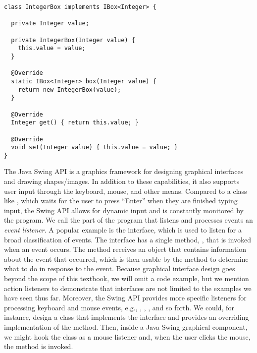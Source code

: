\begin{lstlisting}[language=MyJava]
class IntegerBox implements IBox<Integer> {
  
  private Integer value;
  
  private IntegerBox(Integer value) { 
    this.value = value; 
  }
  
  @Override
  static IBox<Integer> box(Integer value) { 
    return new IntegerBox(value); 
  }
  
  @Override
  Integer get() { return this.value; }
  
  @Override
  void set(Integer value) { this.value = value; }
}
\end{lstlisting}

The Java Swing API is a graphics framework for designing graphical interfaces and drawing shapes/images. In addition to these capabilities, it also supports user input through the keyboard, mouse, and other means. Compared to a class like , which waits for the user to press ``Enter'' when they are finished typing input, the Swing API allows for dynamic input and is constantly monitored by the program. We call the part of the program that listens and processes events an \emph{event listener}. A popular example is the  interface, which is used to listen for a broad classification of events. The  interface has a single method, , that is invoked when an event occurs. The  method receives an  object that contains information about the event that occurred, which is then usable by the method to determine what to do in response to the event. Because graphical interface design goes beyond the scope of this textbook, we will omit a code example, but we mention action listeners to demonstrate that interfaces are not limited to the examples we have seen thus far. Moreover, the Swing API provides more specific listeners for processing keyboard and mouse events, e.g., , , , and so forth. We could, for instance, design a class that implements the  interface and provides an overriding implementation of the  method. Then, inside a Java Swing graphical component, we might hook the class as a mouse listener and, when the user clicks the mouse, the  method is invoked.


